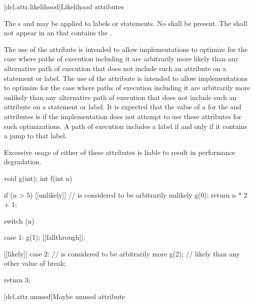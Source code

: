 [dcl.attr.likelihood]{Likelihood attributes}%

\pnum
The s
 and 
may be applied to labels or statements.
No  shall be present.
The  
shall not appear in an 
that contains the  .

\pnum
\begin{note}
The use of the  attribute
is intended to allow implementations to optimize for
the case where paths of execution including it
are arbitrarily more likely
than any alternative path of execution
that does not include such an attribute on a statement or label.
The use of the  attribute
is intended to allow implementations to optimize for
the case where paths of execution including it
are arbitrarily more unlikely
than any alternative path of execution
that does not include such an attribute on a statement or label.
It is expected that the value of a 
for the  and  attributes
is 
if the implementation does not attempt to use these attributes
for such optimizations.
A path of execution includes a label
if and only if it contains a jump to that label.
\end{note}
\begin{note}
Excessive usage of either of these attributes
is liable to result in performance degradation.
\end{note}

\pnum
\begin{example}
\begin{codeblock}
void g(int);
int f(int n) {
  if (n > 5) [[unlikely]] {     //  is considered to be arbitrarily unlikely
    g(0);
    return n * 2 + 1;
  }

  switch (n) {
  case 1:
    g(1);
    [[fallthrough]];

  [[likely]] case 2:            //  is considered to be arbitrarily more
    g(2);                       // likely than any other value of 
    break;
  }
  return 3;
}
\end{codeblock}
\end{example}

[dcl.attr.unused]{Maybe unused attribute}%

